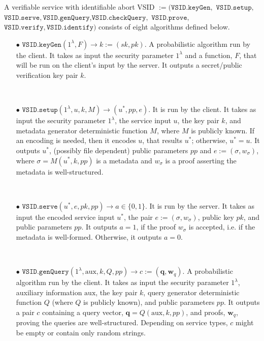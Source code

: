 \begin{definition}\label{service-def} A verifiable service with identifiable abort  VSID $:=(\mathtt{VSID.keyGen}, $ $\mathtt{VSID.setup}, $ $\mathtt{VSID.serve},\mathtt{VSID.genQuery}$,$\mathtt{VSID.checkQuery},$ $\mathtt{VSID.prove},$ $\mathtt{VSID.verify}, \mathtt{VSID.identify})$ consists of eight algorithms defined below.


\begin{itemize}
\item[$\bullet$] $\mathtt{VSID.keyGen}(1^{\lambda},F)\rightarrow k:=(sk,pk)$.  A probabilistic algorithm run by the client. It takes as input the security parameter $1^{\lambda}$ and a function, $F$, that will be run on the client's input by the server. It outputs a secret/public verification key pair $k$. %




\

\item[$\bullet$] $\mathtt{VSID.setup}(1^{\lambda}, u,k,M)\rightarrow (u^{\scriptscriptstyle *}, {pp},e)$. It is run by the client. It takes as input the security parameter $1^{\lambda}$,  the service  input $u$,  the key pair $k$, and metadata generator deterministic function $M$, where $M$ is publicly known. If an encoding is needed, then it encodes $u$, that results $u^{\scriptscriptstyle *}$; otherwise, $u^{\scriptscriptstyle *}=u$. It outputs  $u^{\scriptscriptstyle *}$, {(possibly file dependent) public parameters $pp$} and $e:=(\sigma,w_{\sigma})$, where $\sigma=M(u^{\scriptscriptstyle *},k, {pp})$ is a metadata and $w_{\sigma}$ is a proof asserting the metadata is well-structured.  

\

\item[$\bullet$] $\mathtt{VSID.serve}(u^{\scriptscriptstyle *},e,pk, {pp})\rightarrow a\in\{0,1\}$. It is run by the server. It takes as input the encoded service input $u^{\scriptscriptstyle *}$, the pair $e:=(\sigma,w_{\sigma})$, public key $pk$, and {public parameters $pp$}. It outputs $a=1$, if the proof $w_{\sigma}$ is accepted, i.e. if the metadata is well-formed. Otherwise, it outputs $a=0$. 

\

\item[$\bullet$] $\mathtt{VSID.genQuery}(1^{\lambda},  \text{aux}, k,Q,{pp})\rightarrow c:=(\bm{q},\bm{w}_{\scriptscriptstyle q})$. A probabilistic algorithm run by the client. It takes as input the security parameter $1^{\lambda}$, auxiliary information $ \text{aux}$,  the key pair $k$,    query generator deterministic function $Q$ (where $Q$ is publicly known), and { public parameters $pp$}. It outputs a pair $c$ containing a query vector, $\bm{q}=Q( \text{aux},k,{pp})$,  and proofs, $\bm{w}_{\scriptscriptstyle q}$, proving the queries are well-structured. Depending on service types, $c$ might be  empty or  contain only random strings.


\end{itemize}
\end{definition}
